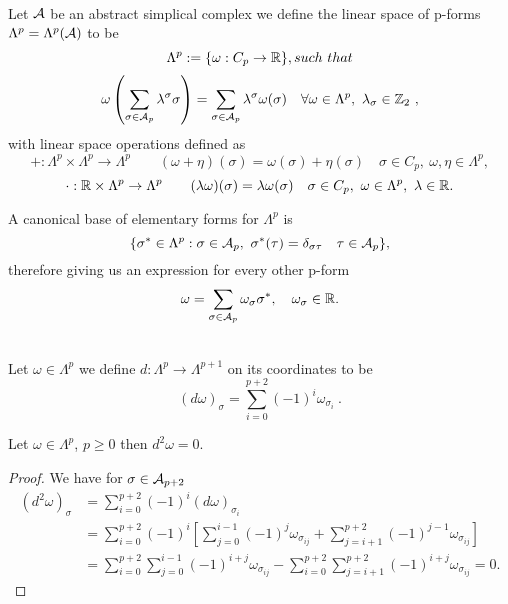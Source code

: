 \documentclass[../1.tex]{subfiles}
\begin{document}
    \begin{defn}
        \\
        Let $\mathcal{A}$ be an abstract simplical complex we define the linear space of p-forms $\Lambda^p = \Lambda^p(\mathcal{A})$ to be 
        \[ \Lambda^p := \{ \omega : C_p \to \R\}, such \ that\]
        \[ \omega \left( \sum_{\sigma \in \mc{A}_p} \lambda^\sigma \sigma \right) = \sum_{\sigma \in \mc{A}_p} \lambda^\sigma \omega(\sigma)
        \quad \forall \omega \in \Lambda^p , \ \lambda_\sigma \in \Z_2 \ ,\]
        with linear space operations defined as
        \[ + : \Lambda^p \times \Lambda^p \to \Lambda^p \quad
        \quad (\omega + \eta)(\sigma) = \omega(\sigma) + \eta(\sigma) \quad \sigma \in C_p,\ \omega,\eta \in \Lambda^p, \]
        \[ \cdot : \mathbb{R} \times \Lambda^p \to \Lambda^p \quad
        \quad (\lambda \omega)(\sigma) = \lambda \omega(\sigma) \quad \sigma \in C_p,\ \omega \in \Lambda^p,\ \lambda \in \mathbb{R}. \]
    \end{defn} 
    \begin{prop}
        A canonical base of elementary forms for $\Lambda^p$ is
        \[ \{\sigma^* \in \Lambda^p : \sigma \in \mathcal{A}_p,\ \sigma^*(\tau) = \delta_{\sigma \tau} \quad \tau \in \mathcal{A}_p\},\]
        therefore giving us an expression for every other p-form
        \[ \omega = \sum_{\sigma \in \mathcal{A}_p} \omega_\sigma \sigma^*, \quad \omega_\sigma \in \mathbb{R}. \]
    \end{prop}
    \begin{defn}
        \\
        Let $\omega \in \Lambda^p$ we define $d : \Lambda^p \to \Lambda^{p+1}$ on its coordinates to be 
        \[ (d \omega)_\sigma = \sum_{i = 0}^{p+2} (-1)^i \omega_{\sigma_i} \ . \]
    \end{defn}
    \begin{lem}
        Let $\omega \in \Lambda^p$, $p \geq 0$ then $d^2 \omega = 0$.
    \end{lem}
    \begin{proof}
        We have for $\sigma \in \mathcal{A}_{p+2}$\\
        \begin{equation*}
            \begin{aligned}
                (d^2 \omega)_\sigma &= \sum_{i = 0}^{p+2} (-1)^i (d \omega)_{\sigma_i} \\
                &= \sum_{i = 0}^{p+2} (-1)^i \left[ \sum_{j = 0}^{i-1}(-1)^j \omega_{\sigma_{ij}} + 
                \sum_{j = i+1}^{p+2} (-1)^{j-1} \omega_{\sigma_{ij}} \right]\\
                &= \sum_{i = 0}^{p+2} \sum_{j = 0}^{i-1} (-1)^{i+j} \omega_{\sigma_{ij}} -
                \sum_{i = 0}^{p+2} \sum_{j = i+1}^{p+2} (-1)^{i+j} \omega_{\sigma_{ij}} = 0.
            \end{aligned}
        \end{equation*}
    \end{proof}
\end{document}
